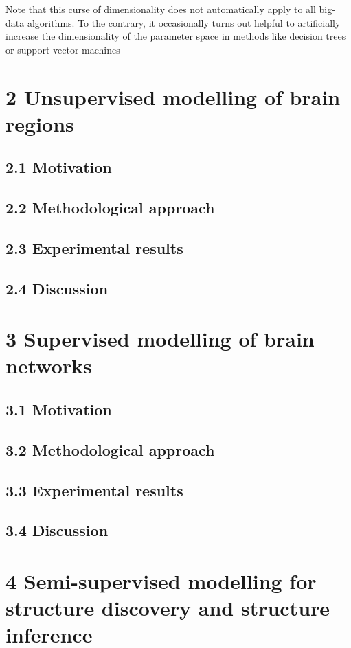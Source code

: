 \documentclass[authoryear,review,3p]{elsarticle}
\begin{document}
Note that this curse of dimensionality does not automatically apply to all big-data algorithms. To the contrary, it occasionally turns out helpful to artificially increase the dimensionality of the parameter space in methods like decision trees or support vector machines 





\section*{2 Unsupervised modelling of brain regions}

\subsection*{2.1 Motivation}
\subsection*{2.2 Methodological approach}
\subsection*{2.3 Experimental results}
\subsection*{2.4 Discussion}



\section*{3 Supervised modelling of brain networks}

\subsection*{3.1 Motivation}
\subsection*{3.2 Methodological approach}
\subsection*{3.3 Experimental results}
\subsection*{3.4 Discussion}


\section*{4 Semi-supervised modelling for structure discovery
and structure inference}
\end{document}
